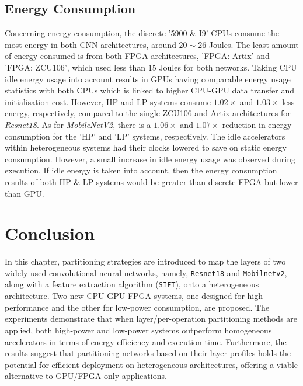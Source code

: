 \subsection{Energy Consumption}
Concerning energy consumption, the discrete '5900 \& I9' CPUs consume the most energy in both CNN architectures, around $20\sim26$ Joules. The least amount of energy consumed is from both FPGA architectures, 'FPGA: Artix' and 'FPGA: ZCU106', which used less than $15$ Joules for both networks. Taking CPU idle energy usage into account results in GPUs having comparable energy usage statistics with both CPUs which is linked to higher CPU-GPU data transfer and initialisation cost. However, HP and LP systems consume $1.02\times$ and $1.03\times$ less energy, respectively, compared to the single ZCU106 and Artix architectures for \textit{Resnet18}. As for \textit{MobileNetV2}, there is a $1.06\times$ and $1.07\times$ reduction in energy consumption for the 'HP' and 'LP' systems, respectively. The idle accelerators within heterogeneous systems had their clocks lowered to save on static energy consumption. However, a small increase in idle energy usage was observed during execution. If idle energy is taken into account, then the energy consumption results of both HP \& LP systems would be greater than discrete FPGA but lower than GPU.




\section{Conclusion}
In this chapter, partitioning strategies are introduced to map the layers of two widely used convolutional neural networks, namely, \texttt{Resnet18} and \texttt{Mobilnetv2}, along with a feature extraction algorithm (\texttt{SIFT}), onto a heterogeneous architecture. Two new CPU-GPU-FPGA systems, one designed for high performance and the other for low-power consumption, are proposed. The experiments demonstrate that when layer/per-operation partitioning methods are applied, both high-power and low-power systems outperform homogeneous accelerators in terms of energy efficiency and execution time. Furthermore, the results suggest that partitioning networks based on their layer profiles holds the potential for efficient deployment on heterogeneous architectures, offering a viable alternative to GPU/FPGA-only applications.


